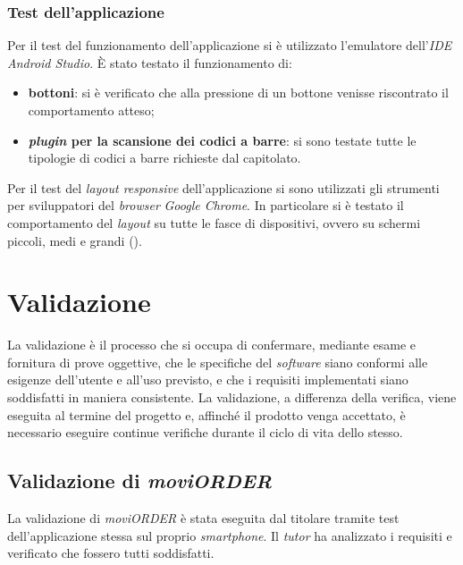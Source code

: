 \subsubsection{Test dell'applicazione}

Per il test del funzionamento dell'applicazione si è utilizzato l'emulatore dell'\textit{IDE} \textit{Android Studio}. È stato testato il funzionamento di:
\begin{itemize}
	\item \textbf{bottoni}: si è verificato che alla pressione di un bottone venisse riscontrato il comportamento atteso;
	\item \textbf{\textit{plugin} per la scansione dei codici a barre}: si sono testate tutte le tipologie di codici a barre richieste dal capitolato.
\end{itemize}

Per il test del \textit{layout responsive} dell'applicazione si sono utilizzati gli strumenti per sviluppatori del \textit{browser} \textit{Google Chrome}. In particolare si è testato il comportamento del \textit{layout} su tutte le fasce di dispositivi, ovvero su schermi piccoli, medi e grandi ().

\section{Validazione}

La validazione è il processo che si occupa di confermare, mediante esame e fornitura di prove oggettive, che le specifiche del \textit{software} siano conformi alle esigenze dell'utente e all'uso previsto, e che i requisiti implementati siano soddisfatti in maniera consistente.
La validazione, a differenza della verifica, viene eseguita al termine del progetto e, affinché il prodotto venga accettato, è necessario eseguire continue verifiche durante il ciclo di vita dello stesso.

\subsection{Validazione di \textit{moviORDER}}

La validazione di \textit{moviORDER} è stata eseguita dal titolare tramite test dell'applicazione stessa sul proprio \textit{smartphone}. Il \textit{tutor} ha analizzato i requisiti e verificato che fossero tutti soddisfatti.
